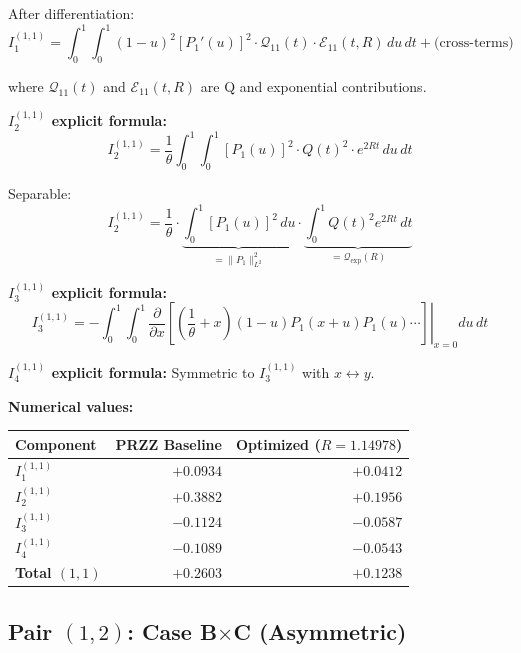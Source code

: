 \documentclass[11pt]{article}
\begin{document}
After differentiation:
\begin{equation}
I_1^{(1,1)} = \int_0^1 \int_0^1 (1-u)^2 \left[P_1'(u)\right]^2 \cdot \mathcal{Q}_{11}(t) \cdot \mathcal{E}_{11}(t, R) \, du\, dt + \text{(cross-terms)}
\end{equation}

where $\mathcal{Q}_{11}(t)$ and $\mathcal{E}_{11}(t, R)$ are Q and exponential contributions.

\textbf{$I_2^{(1,1)}$ explicit formula:}
\begin{equation}
I_2^{(1,1)} = \frac{1}{\theta} \int_0^1 \int_0^1 [P_1(u)]^2 \cdot Q(t)^2 \cdot e^{2Rt} \, du\, dt
\end{equation}

Separable:
\begin{equation}
I_2^{(1,1)} = \frac{1}{\theta} \cdot \underbrace{\int_0^1 [P_1(u)]^2 \, du}_{= \|P_1\|_{L^2}^2} \cdot \underbrace{\int_0^1 Q(t)^2 e^{2Rt} \, dt}_{= \mathcal{Q}_{\exp}(R)}
\end{equation}

\textbf{$I_3^{(1,1)}$ explicit formula:}
\begin{equation}
I_3^{(1,1)} = -\int_0^1 \int_0^1 \left.\frac{\partial}{\partial x}\left[\left(\frac{1}{\theta} + x\right) (1-u) P_1(x+u) P_1(u) \cdots\right]\right|_{x=0} du\, dt
\end{equation}

\textbf{$I_4^{(1,1)}$ explicit formula:}
Symmetric to $I_3^{(1,1)}$ with $x \leftrightarrow y$.

\textbf{Numerical values:}

\begin{center}
\begin{tabular}{lrr}
\toprule
Component & PRZZ Baseline & Optimized ($R=1.14978$) \\
\midrule
$I_1^{(1,1)}$ & $+0.0934$ & $+0.0412$ \\
$I_2^{(1,1)}$ & $+0.3882$ & $+0.1956$ \\
$I_3^{(1,1)}$ & $-0.1124$ & $-0.0587$ \\
$I_4^{(1,1)}$ & $-0.1089$ & $-0.0543$ \\
\midrule
\textbf{Total $(1,1)$} & $+0.2603$ & $+0.1238$ \\
\bottomrule
\end{tabular}
\end{center}

\subsection{Pair $(1,2)$: Case B$\times$C (Asymmetric)}
\end{document}

